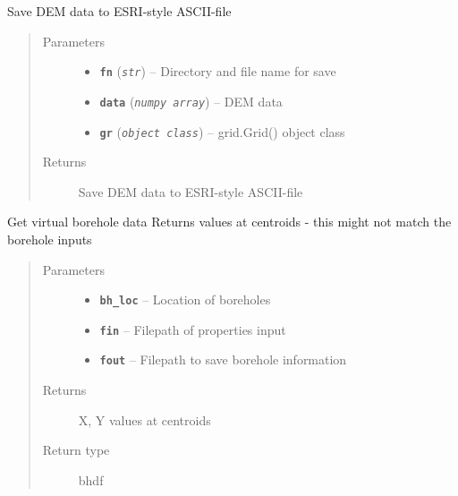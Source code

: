 \documentclass[letterpaper,10pt,english]{sphinxmanual}
\begin{document}
\begin{fulllineitems}
\label{hyvr:hyvr.hyvr.utils.dem_save}
Save DEM data to ESRI-style ASCII-file
\begin{quote}\begin{description}
\item[{Parameters}] \leavevmode\begin{itemize}
\item {} 
\textbf{\texttt{fn}} (\emph{\texttt{str}}) -- Directory and file name for save

\item {} 
\textbf{\texttt{data}} (\emph{\texttt{numpy array}}) -- DEM data

\item {} 
\textbf{\texttt{gr}} (\emph{\texttt{object class}}) -- grid.Grid() object class

\end{itemize}

\item[{Returns}] \leavevmode
Save DEM data to ESRI-style ASCII-file

\end{description}\end{quote}

\end{fulllineitems}


\begin{fulllineitems}
\label{hyvr:hyvr.hyvr.utils.get_boreholes}
Get virtual borehole data
Returns values at centroids - this might not match the borehole inputs
\begin{quote}\begin{description}
\item[{Parameters}] \leavevmode\begin{itemize}
\item {} 
\textbf{\texttt{bh\_loc}} -- Location of boreholes

\item {} 
\textbf{\texttt{fin}} -- Filepath of properties input

\item {} 
\textbf{\texttt{fout}} -- Filepath to save borehole information

\end{itemize}

\item[{Returns}] \leavevmode
X, Y values at centroids

\item[{Return type}] \leavevmode
bhdf

\end{description}\end{quote}

\end{fulllineitems}
\end{document}
